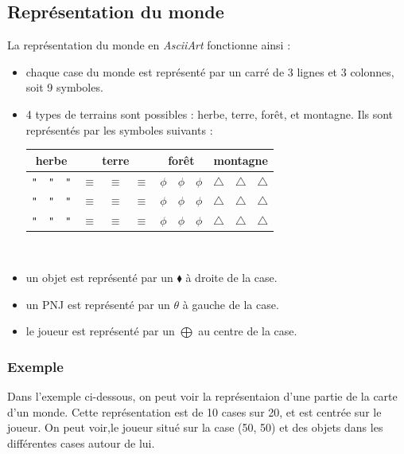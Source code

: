 \documentclass[asi]{picINSA}
\begin{document}
\subsection{Représentation du monde}
La représentation du monde en \textit{AsciiArt} fonctionne ainsi :
\begin{itemize}
\item chaque case du monde est représenté par un carré de 3 lignes et 3 colonnes, soit 9 symboles.
\item 4 types de terrains sont possibles : herbe, terre, forêt, et montagne. Ils sont représentés par les symboles suivants : \\
\begin{tabular}{| c c c | c c c | c c c | c c c | }
 \hline		
  \multicolumn{3}{|c|}{herbe} & \multicolumn{3}{|c|}{terre} & \multicolumn{3}{|c|}{forêt} & \multicolumn{3}{|c|}{montagne} \\	
\hline
    \verb+"+ & \verb+"+ & \verb+"+ & $\equiv$ & $\equiv$ & $\equiv$ & $\phi$ & $\phi$ & $\phi$ & $\triangle$ & $\triangle$ & $\triangle$ \\
    \verb+"+ & \verb+"+ & \verb+"+ & $\equiv$ & $\equiv$ & $\equiv$ & $\phi$ & $\phi$ & $\phi$ & $\triangle$ & $\triangle$ & $\triangle$ \\
    \verb+"+ & \verb+"+ & \verb+"+ & $\equiv$ & $\equiv$ & $\equiv$ & $\phi$ & $\phi$ & $\phi$ & $\triangle$ & $\triangle$ & $\triangle$ \\
 \hline  
 \end{tabular}
~\\
\item un objet est représenté par un $\blacklozenge$ à droite de la case.
\item un PNJ est représenté par un $\theta$ à gauche de la case.
\item le joueur est représenté par un $\bigoplus$ au centre de la case.
\end{itemize}
\subsubsection{Exemple}
Dans l'exemple ci-dessous, on peut voir la représentaion d'une partie de la carte d'un monde. Cette représentation est de 10 cases sur 20, et est centrée sur le joueur. On peut voir,le joueur situé sur la case (50, 50) et des objets dans les différentes cases autour de lui.
\end{document}
